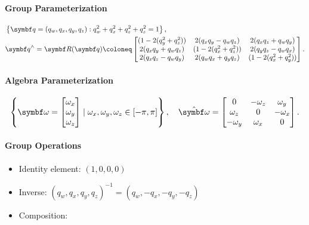 \begin{properties}[breakable, title={$\SOthree$ parameterized by $\Sthree$}]
  \paragraph{Group Parameterization}
  \begin{equation}
    \begin{aligned}
       & \left\{ \bq = (q_{w}, q_{x}, q_{y}, q_{z}) : q_{w}^{2} + q_{x}^{2} + q_{z}^{2} + q_{z}^{2} = 1 \right\}, \\
       & \bq^{\wedge} = \bR(\bq) \coloneq \begin{bmatrix}
        (1 - 2(q_y^2 + q_z^2)) & 2(q_x q_y - q_w q_z)    & 2( q_x q_z + q_w q_y ) \\
        2(q_x q_y + q_w q_z)   & (1 - 2 (q_x^2 + q_z^2)) & 2( q_y q_z-q_w q_x)    \\
        2 (q_x q_z  - q_w q_y) & 2 (q_w q_x + q_y q_z)   & (1 - 2(q_x^2 + q_y^2))
      \end{bmatrix}.
    \end{aligned}
  \end{equation}

  \paragraph{Algebra Parameterization}
  \begin{equation}
    \left\{ \bomega = \begin{bmatrix} \omega_{x} \\ \omega_{y} \\ \omega_{z} \end{bmatrix}
    \mid \omega_{x}, \omega_{y}, \omega_{z} \in [-\pi, \pi] \right\}, \quad \hat \bomega = \begin{bmatrix} 0 & -\omega_{z} & \omega_{y} \\ \omega_{z} & 0 & -\omega_{x} \\ -\omega_{y} & \omega_{x} & 0 \end{bmatrix}.
  \end{equation}

  \paragraph{Group Operations}
  \begin{itemize}
    \item Identity element: $(1, 0, 0, 0)$
    \item Inverse: $(q_{w}, q_{x}, q_{y}, q_{z})^{-1} = (q_{w}, -q_{x}, -q_{y}, -q_{z})$
    \item Composition:
  \end{itemize}


\end{properties}
